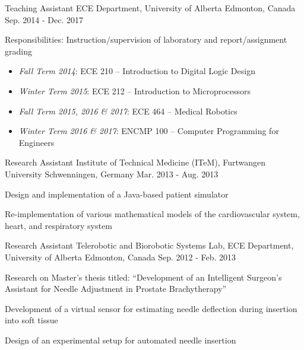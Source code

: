 \begin{cventries}
  \cventry
    {Teaching Assistant} %
    {ECE Department, University of Alberta} %
    {Edmonton, Canada} %
    {Sep. 2014 - Dec. 2017} %
    {
      \begin{cvitems}
        \item {Responsibilities: Instruction/supervision of laboratory and report/assignment grading}
        \begin{itemize}
          \item {\emph{Fall Term 2014}: ECE 210 -- Introduction to Digital Logic Design}
          \item {\emph{Winter Term 2015}: ECE 212 -- Introduction to Microprocessors}
          \item {\emph{Fall Term 2015, 2016 \& 2017}: ECE 464 -- Medical Robotics}
          \item {\emph{Winter Term 2016 \& 2017}: ENCMP 100 -- Computer Programming for Engineers}
        \end{itemize}
      \end{cvitems}
    }

    \cventry
      {Research Assistant} %
      {Institute of Technical Medicine (ITeM), Furtwangen University} %
      {Schwenningen, Germany} %
      {Mar. 2013 - Aug. 2013} %
      {
        \begin{cvitems}
          \item {Design and implementation of a Java-based patient simulator}
          \item {Re-implementation of various mathematical models of the cardiovascular system, heart, and respiratory system}
        \end{cvitems}
      }

    \cventry
      {Research Assistant} %
      {Telerobotic and Biorobotic Systems Lab, ECE Department, University of Alberta} %
      {Edmonton, Canada} %
      {Sep. 2012 - Feb. 2013} %
      {
        \begin{cvitems}
          \item {Research on Master's thesis titled: ``Development of an Intelligent Surgeon's Assistant for Needle Adjustment in Prostate Brachytherapy''}
          \item {Development of a virtual sensor for estimating needle deflection during insertion into soft tissue}
          \item {Design of an experimental setup for automated needle insertion}
        \end{cvitems}
      }


\end{cventries}
